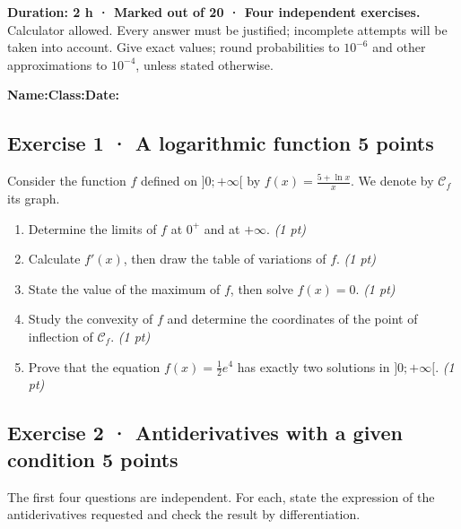 \textbf{Duration: 2 h · Marked out of 20 · Four independent exercises.}\\Calculator allowed. Every answer must be justified; incomplete attempts will be taken into account. Give exact values; round probabilities to $10^{-6}$ and other approximations to $10^{-4}$, unless stated otherwise.

\smallskip\textbf{Name:}\enspace\dotfill\quad\textbf{Class:}\enspace\dotfill\quad\textbf{Date:}\enspace\dotfill

\subsection*{Exercise 1 · A logarithmic function \hfill 5 points}Consider the function $f$ defined on $]0;+\infty[$ by $f(x)=\frac{5+\ln x}x$. We denote by $\mathcal C_f$ its graph.

\begin{enumerate}

\item Determine the limits of $f$ at $0^+$ and at $+\infty$. \hfill\textit{(1 pt)}

\item Calculate $f' (x)$, then draw the table of variations of $f$. \hfill\textit{(1 pt)}

\item State the value of the maximum of $f$, then solve $f(x)=0$. \hfill\textit{(1 pt)}

\item Study the convexity of $f$ and determine the coordinates of the point of inflection of $\mathcal C_f$. \hfill\textit{(1 pt)}

\item Prove that the equation $f(x)=\frac12 e^{4}$ has exactly two solutions in $]0;+\infty[$. \hfill\textit{(1 pt)}

\end{enumerate}

\subsection*{Exercise 2 · Antiderivatives with a given condition \hfill 5 points}The first four questions are independent. For each, state the expression of the antiderivatives requested and check the result by differentiation.

